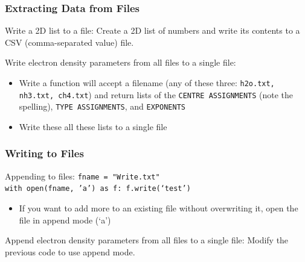 \documentclass{beamer}
\newcommand{\code}[1]{\texttt{#1}}
\newcommand{\tab}{\hspace*{22pt}}
\begin{document}
\begin{frame}	
	\frametitle{Extracting Data from Files}
	
	\begin{exampleblock}{Write a 2D list to a file:}
		Create a 2D list of numbers and write its contents to a CSV (comma-separated value) file.
	\end{exampleblock}
	
	\begin{exampleblock}{Write electron density parameters from all files to a single file:}
		\begin{itemize}
			\item Write a function will accept a filename (any of these three: \code{h2o.txt, nh3.txt, ch4.txt}) and return lists of the \code{CENTRE ASSIGNMENTS} (note the spelling), \code{TYPE ASSIGNMENTS}, and \code{EXPONENTS}
			\item Write these all these lists to a single file
		\end{itemize}		
	\end{exampleblock}
	
\end{frame}

\begin{frame}	
	\frametitle{Writing to Files}
	
	\begin{block}{Appending to files:}
			\code{fname = "Write.txt" \\
					with open(fname, 'a') as f:
					\tab f.write(`test')
			}
		\endminipage\hfill
			\begin{itemize}
				\item If you want to add more to an existing file without overwriting it, open the file in append mode (`a')
			\end{itemize}
		\endminipage\hfill
	\end{block}
	
	\begin{exampleblock}{Append electron density parameters from all files to a single file:}
		Modify the previous code to use append mode.
	\end{exampleblock}
	
\end{frame}
\end{document}
